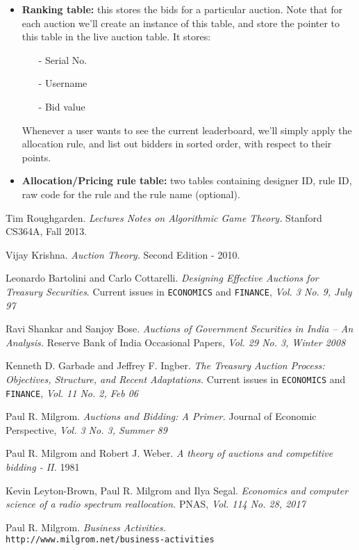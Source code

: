 \documentclass[a4paper]{article}
\begin{document}
\begin{itemize}
    \item \textbf{Ranking table:} this stores the bids for a particular auction. Note that for each auction we'll create an instance of this table, and store the pointer to this table in the live auction table. 
    It stores:
    \begin{itemize}
        \item[-] Serial No.
        \item[-] Username
        \item[-] Bid value
    \end{itemize}
    Whenever a user wants to see the current leaderboard, we'll simply apply the allocation rule, and list out bidders in sorted order, with respect to their points.

    \item \textbf{Allocation/Pricing rule table:} two tables containing designer ID, rule ID, raw code for the rule and the rule name (optional).
\end{itemize}



\pagebreak
\begin{thebibliography}{9}

Tim Roughgarden.
\textit{Lectures Notes on Algorithmic Game Theory.}
Stanford CS364A, Fall 2013.

Vijay Krishna.
\textit{Auction Theory.}
Second Edition - 2010.

Leonardo Bartolini and Carlo Cottarelli.
\textit{Designing Effective Auctions for Treasury Securities}. 
Current issues in \texttt{ECONOMICS} and \texttt{FINANCE}, \textit{Vol. 3 No. 9, July 97}

Ravi Shankar and Sanjoy Bose. 
\textit{Auctions of Government Securities in India – An Analysis.}
Reserve Bank of India Occasional Papers,\textit{ Vol. 29 No. 3, Winter 2008}

Kenneth D. Garbade and Jeffrey F. Ingber.
\textit{The Treasury Auction Process: Objectives, Structure, and Recent Adaptations.}
Current issues in \texttt{ECONOMICS} and \texttt{FINANCE}, \textit{Vol. 11 No. 2, Feb 06}

\bibitem{}
Paul R. Milgrom.
\textit{Auctions and Bidding: A Primer.}
Journal of Economic Perspective, \textit{Vol. 3 No. 3, Summer 89}

Paul R. Milgrom and Robert J. Weber.
\textit{A theory of auctions and competitive bidding - II.}
1981

Kevin Leyton-Brown, Paul R. Milgrom and Ilya Segal.
\textit{Economics and computer science of a radio spectrum reallocation.}
PNAS, \textit{Vol. 114 No. 28, 2017}

Paul R. Milgrom.
\textit{Business Activities.}
\\\texttt{http://www.milgrom.net/business-activities}
\end{thebibliography}
\end{document}
